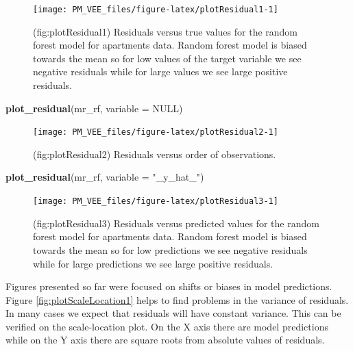 \documentclass[12pt,]{krantz}
\newenvironment{Shaded}{\begin{snugshade}}{\end{snugshade}}
\newcommand{\DataTypeTok}[1]{\textcolor[rgb]{0.13,0.29,0.53}{#1}}
\newcommand{\KeywordTok}[1]{\textcolor[rgb]{0.13,0.29,0.53}{\textbf{#1}}}
\newcommand{\NormalTok}[1]{#1}
\newcommand{\OtherTok}[1]{\textcolor[rgb]{0.56,0.35,0.01}{#1}}
\newcommand{\StringTok}[1]{\textcolor[rgb]{0.31,0.60,0.02}{#1}}
\begin{document}
\begin{figure}

{\centering \texttt{[image: PM\_VEE\_files/figure-latex/plotResidual1-1]} 

}

\caption{(fig:plotResidual1) Residuals versus true values for the random forest model for apartments data. Random forest model is biased towards the mean so for low values of the target variable we see negative residuals while for large values we see large positive residuals.}\label{fig:plotResidual1}
\end{figure}

\begin{Shaded}
\begin{Highlighting}[]
\KeywordTok{plot_residual}\NormalTok{(mr_rf, }\DataTypeTok{variable =} \OtherTok{NULL}\NormalTok{)}
\end{Highlighting}
\end{Shaded}

\begin{figure}

{\centering \texttt{[image: PM\_VEE\_files/figure-latex/plotResidual2-1]} 

}

\caption{(fig:plotResidual2) Residuals versus order of observations. }\label{fig:plotResidual2}
\end{figure}

\begin{Shaded}
\begin{Highlighting}[]
\KeywordTok{plot_residual}\NormalTok{(mr_rf, }\DataTypeTok{variable =} \StringTok{"_y_hat_"}\NormalTok{)}
\end{Highlighting}
\end{Shaded}

\begin{figure}

{\centering \texttt{[image: PM\_VEE\_files/figure-latex/plotResidual3-1]} 

}

\caption{(fig:plotResidual3) Residuals versus predicted values for the random forest model for apartments data. Random forest model is biased towards the mean so for low predictions we see negative residuals while for large predictions we see large positive residuals.}\label{fig:plotResidual3}
\end{figure}

Figures presented so far were focused on shifts or biases in model predictions.
Figure \ref{fig:plotScaleLocation1} helps to find problems in the variance of residuals. In many cases we expect that residuals will have constant variance. This can be verified on the scale-location plot. On the X axis there are model predictions while on the Y axis there are square roots from absolute values of residuals.
\end{document}
